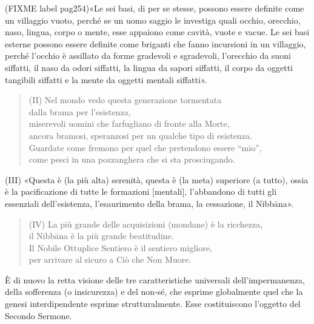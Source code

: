 

(FIXME label pag254)«Le sei basi, di per se stesse, possono essere definite come un
villaggio vuoto, perché se un uomo saggio le investiga quali occhio,
orecchio, naso, lingua, corpo o mente, esse appaiono come cavità, vuote
e vacue. Le sei basi esterne possono essere definite come briganti che
fanno incursioni in un villaggio, perché l’occhio è assillato da forme
gradevoli e sgradevoli, l’orecchio da suoni siffatti, il naso da odori
siffatti, la lingua da sapori siffatti, il corpo da oggetti tangibili
siffatti e la mente da oggetti mentali siffatti».




\begin{quote}
(II) Nel mondo vedo questa generazione tormentata \\
dalla brama per l’esistenza, \\
miserevoli uomini che farfugliano di fronte alla Morte, \\
ancora bramosi, speranzosi per un qualche tipo di esistenza. \\
Guardate come fremono per quel che pretendono essere “mio”, \\
come pesci in una pozzanghera che si sta prosciugando.
\end{quote}



(III) «Questa è (la più alta) serenità, questa è (la meta) superiore (a
tutto), ossia è la pacificazione di tutte le formazioni [mentali],
l’abbandono di tutti gli essenziali dell’esistenza, l’esaurimento della
brama, la cessazione, il Nibbāna».




\begin{quote}
(IV) La più grande delle acquisizioni (mondane) è la ricchezza, \\
il Nibbāna è la più grande beatitudine. \\
Il Nobile Ottuplice Sentiero è il sentiero migliore, \\
per arrivare al sicuro a Ciò che Non Muore.
\end{quote}



 È di nuovo la retta visione delle tre caratteristiche
universali dell’impermanenza, della sofferenza (o insicurezza) e del
non-sé, che esprime globalmente quel che la genesi interdipendente
esprime strutturalmente. Esse costituiscono l’oggetto del Secondo
Sermone.


